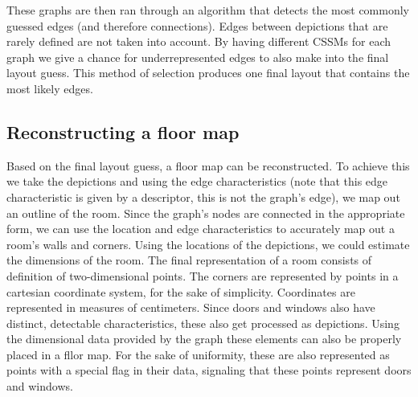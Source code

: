 These graphs are then ran through an algorithm that detects the most commonly guessed edges (and therefore connections). Edges between depictions that are rarely defined are not taken into account. By having different CSSMs for each graph we give a chance for underrepresented edges to also make into the final layout guess. This method of selection produces one final layout that contains the most likely edges.


\subsection{Reconstructing a floor map}

Based on the final layout guess, a floor map can be reconstructed. To achieve this we take the depictions and using the edge characteristics (note that this edge characteristic is given by a descriptor, this is not the graph's edge), we map out an outline of the room. Since the graph's nodes are connected in the appropriate form, we can use the location and edge characteristics to accurately map out a room's walls and corners. Using the locations of the depictions, we could estimate the dimensions of the room. The final representation of a room consists of definition of two-dimensional points. The corners are represented by points in a cartesian coordinate system, for the sake of simplicity. Coordinates are represented in measures of centimeters. Since doors and windows also have distinct, detectable characteristics, these also get processed as depictions. Using the dimensional data provided by the graph these elements can also be properly placed in a fllor map. For the sake of uniformity, these are also represented as points with a special flag in their data, signaling that these points represent doors and windows.



